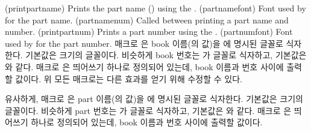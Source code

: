 \glossary(printpartname)%
  {}
  {Prints the part name () using the .}
\glossary(partnamefont)%
  {}%
  {Font used by  for the part name.}
\glossary(partnamenum)%
  {}%
  {Called between printing a part name and number.}
\glossary(printpartnum)%
  {}%
  {Prints a part number using the .}
\glossary(partnumfont)%
  {}%
  {Font used by  for the part number.}
매크로 \cmd{\printbookname}은 book 이름(\cmd{\bookname}의 값)을
\cmd{\booknamefont}에 명시된 글꼴로 식자한다. 기본값은 \cmd{\huge} 크기의
\cmd{\bfseries} 글꼴이다. 비슷하게 book 번호는 \cmd{\printbooknum}가
\cmd{\booknumfont} 글꼴로 식자하고, 기본값은 \cmd{\booknamefont}와 같다. 매크로
\cmd{\booknamenum}은 띄어쓰기 하나로 정의되어 있는데, book 이름과 번호 사이에
출력할 값이다. 위 모든 매크로는 다른 효과를 얻기 위해 수정할 수 있다.

유사하게, 매크로 \cmd{\printpartname}은 part 이름(\cmd{\partname}의 값)을
\cmd{\partnamefont}에 명시된 글꼴로 식자한다. 기본값은 \cmd{\huge} 크기의
\cmd{\bfseries} 글꼴이다. 비슷하게 part 번호는 \cmd{\printpartnum}가
\cmd{\partnumfont} 글꼴로 식자하고, 기본값은 \cmd{\partnamefont}와 같다. 매크로
\cmd{\partnamenum}은 띄어쓰기 하나로 정의되어 있는데, book 이름과 번호 사이에
출력할 값이다.

